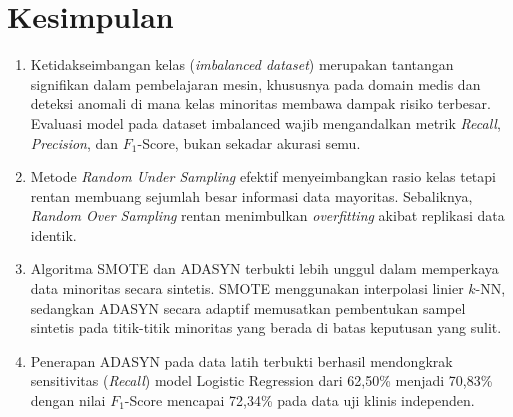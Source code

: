 \documentclass[a4paper,oneside,12pt]{report}
\begin{document}
\section{Kesimpulan}
\begin{enumerate}
    \item Ketidakseimbangan kelas (\textit{imbalanced dataset}) merupakan tantangan signifikan dalam pembelajaran mesin, khususnya pada domain medis dan deteksi anomali di mana kelas minoritas membawa dampak risiko terbesar. Evaluasi model pada dataset imbalanced wajib mengandalkan metrik \textit{Recall}, \textit{Precision}, dan $F_1$-Score, bukan sekadar akurasi semu.
    \item Metode \textit{Random Under Sampling} efektif menyeimbangkan rasio kelas tetapi rentan membuang sejumlah besar informasi data mayoritas. Sebaliknya, \textit{Random Over Sampling} rentan menimbulkan \textit{overfitting} akibat replikasi data identik.
    \item Algoritma SMOTE dan ADASYN terbukti lebih unggul dalam memperkaya data minoritas secara sintetis. SMOTE menggunakan interpolasi linier $k$-NN, sedangkan ADASYN secara adaptif memusatkan pembentukan sampel sintetis pada titik-titik minoritas yang berada di batas keputusan yang sulit.
    \item Penerapan ADASYN pada data latih terbukti berhasil mendongkrak sensitivitas (\textit{Recall}) model Logistic Regression dari 62,50\% menjadi 70,83\% dengan nilai $F_1$-Score mencapai 72,34\% pada data uji klinis independen.
\end{enumerate}
\clearpage
\end{document}
